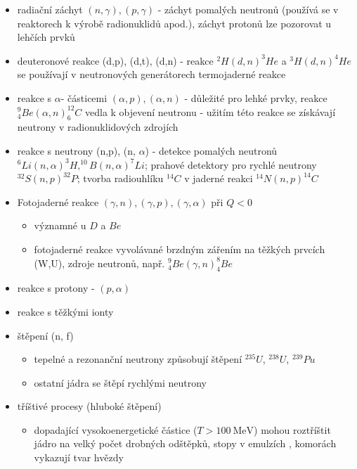 \documentclass[../../main.tex]{subfiles}
\begin{document}
\begin{itemize}
	\item radiační záchyt $(n, \gamma), (p, \gamma)$ - záchyt pomalých neutronů (používá se v reaktorech k výrobě radionuklidů apod.), záchyt protonů lze pozorovat u lehčích prvků
	
	\item deuteronové reakce (d,p), (d,t), (d,n) - reakce $^{2}H(d,n)^{3}He$ a $^{3}H (d,n)^{4}He$ se používají v neutronových generátorech termojaderné reakce 
	
	\item reakce s $\alpha$- částicemi $(\alpha, p), (\alpha,n)$ - důležité pro lehké prvky, reakce $^{9}_{4}Be(\alpha, n)^{12}_{6}C$ vedla k objevení neutronu - užitím této reakce se získávají neutrony v radionuklidových zdrojích
	
	\item reakce s neutrony (n,p), (n, $\alpha$) - detekce pomalých neutronů $^{6}Li(n, \alpha)^{3}H, ^{10}B(n, \alpha)^{7}Li$; prahové detektory pro rychlé neutrony $^{32}S(n,p)^{32}P$; tvorba radiouhlíku $^{14}C$ v jaderné reakci $^{14}N(n,p)^{14}C$
	
	\item Fotojaderné reakce $(\gamma, n), (\gamma, p) , (\gamma, \alpha)$ při $Q<0$
	\begin{itemize}
		\item významné u $D$ a $Be$
		\item fotojaderné reakce vyvolávané brzdným zářením na těžkých prvcích (W,U), zdroje neutronů, např. $^{9}_{4}Be(\gamma, n)^{8}_{4}Be$
	\end{itemize}
	
	\item reakce s protony - $(p, \alpha)$
	
	\item reakce s těžkými ionty
	
	\item štěpení (n, f)
	\begin{itemize}
		\item tepelné a rezonanční neutrony způsobují štěpení $^{235}U$, $^{238}U$, $^{239}Pu$
		\item ostatní jádra se štěpí rychlými neutrony
	\end{itemize}
	
	\item tříštivé procesy (hluboké štěpení)
	\begin{itemize}
		\item dopadající vysokoenergetické částice ($T > 100 ~\mathrm{MeV}$) mohou roztříštit jádro na velký počet drobných odštěpků, stopy v emulzích , komorách vykazují tvar hvězdy
	\end{itemize}
\end{itemize}
\end{document}
